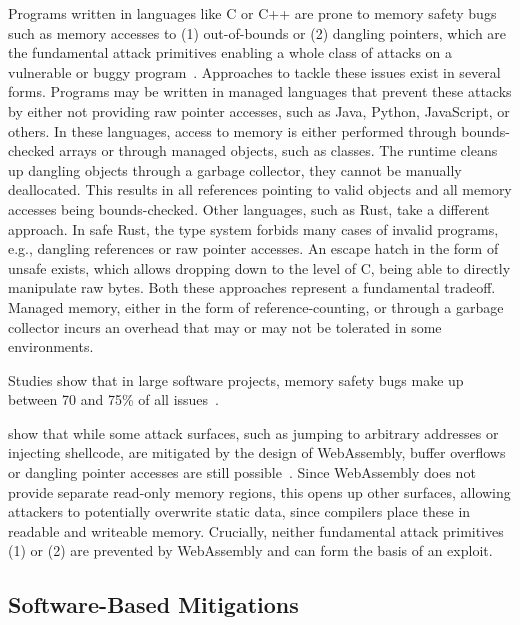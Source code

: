 Programs written in languages like C or C++ are prone to memory safety bugs such as memory accesses to (1) out-of-bounds or (2) dangling pointers, which are the fundamental attack primitives enabling a whole class of attacks on a vulnerable or buggy program~\cite{szekeres2013sok}.
Approaches to tackle these issues exist in several forms.
Programs may be written in managed languages that prevent these attacks by either not providing raw pointer accesses, such as Java, Python, JavaScript, or others.
In these languages, access to memory is either performed through bounds-checked arrays or through managed objects, such as classes.
The runtime cleans up dangling objects through a garbage collector, they cannot be manually deallocated.
This results in all references pointing to valid objects and all memory accesses being bounds-checked.
Other languages, such as Rust, take a different approach.
In safe Rust, the type system forbids many cases of invalid programs, e.g., dangling references or raw pointer accesses.
An escape hatch in the form of unsafe exists, which allows dropping down to the level of C, being able to directly manipulate raw bytes.
Both these approaches represent a fundamental tradeoff.
Managed memory, either in the form of reference-counting, or through a garbage collector incurs an overhead that may or may not be tolerated in some environments.

Studies show that in large software projects, memory safety bugs make up between 70 and 75\% of all issues~\cite{chromium_memory_safety,microsoft_memory_safety,android_memory_safety}.

\citeauthor*{lehmann2020everything} show that while some attack surfaces, such as jumping to arbitrary addresses or injecting shellcode, are mitigated by the design of WebAssembly, buffer overflows or dangling pointer accesses are still possible~\cite{lehmann2020everything}.
Since WebAssembly does not provide separate read-only memory regions, this opens up other surfaces, allowing attackers to potentially overwrite static data, since compilers place these in readable and writeable memory.
Crucially, neither fundamental attack primitives (1) or (2) are prevented by WebAssembly and can form the basis of an exploit.

\subsection{Software-Based Mitigations}
\label{subsec:software-based-mitigations}

